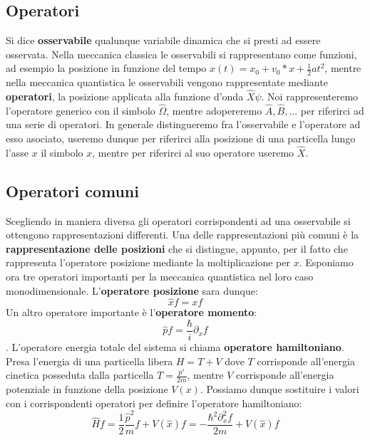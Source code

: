 \subsection{Operatori}
Si dice \textbf{osservabile} qualunque variabile dinamica che si presti ad essere osservata. Nella meccanica classica le osservabili si rappresentano come funzioni, ad esempio la posizione in funzione del tempo $x(t) = x_0 + v_0 * x + \frac{1}{2} a t^2$, mentre nella meccanica quantistica le osservabili vengono rappresentate mediante \textbf{operatori}, la posizione applicata alla funzione d'onda $\hat{X}\psi$. Noi rappresenteremo l'operatore generico con il simbolo $\hat{\Omega}$, mentre adopereremo $\hat{A}, \hat{B}, ...$ per riferirci ad una serie di operatori. In generale distingueremo fra l'osservabile e l'operatore ad esso asociato, useremo dunque per riferirci alla posizione di una particella lungo l'asse $x$ il simbolo $x$, mentre per riferirci al suo operatore useremo $\hat{X}$.

\subsection{Operatori comuni}
Scegliendo in maniera diversa gli operatori corrispondenti ad una osservabile si ottengono rappresentazioni differenti. Una delle rappresentazioni più comuni è la \textbf{rappresentazione delle posizioni} che si distingue, appunto, per il fatto che rappresenta l'operatore posizione mediante la moltiplicazione per $x$. Esponiamo ora tre operatori importanti per la meccanica quantistica nel loro caso monodimensionale. L'\textbf{operatore posizione} sara dunque:
$$\hat{x} f = x f$$
Un altro operatore importante è l'\textbf{operatore momento}:
$$\hat{p} f = \frac{\hbar}{i} \partial_x f$$.
L'operatore energia totale del sistema si chiama \textbf{operatore hamiltoniano}. Presa l'energia di una particella libera $H = T + V$ dove $T$ corrisponde all'energia cinetica posseduta dalla particella $T = \frac{p^s}{2 m}$, mentre $V$ corrisponde all'energia potenziale in funzione della posizione $V(x)$. Possiamo dunque sostituire i valori con i corrispondenti operatori per definire l'operatore hamiltoniano:
$$\hat{H} f = \frac{1}{2}\frac{\hat{p}^2}{m} f + V(\hat{x}) f = -\frac{\hbar^2 \partial_x^2 f}{2 m} + V(\hat{x}) f$$

